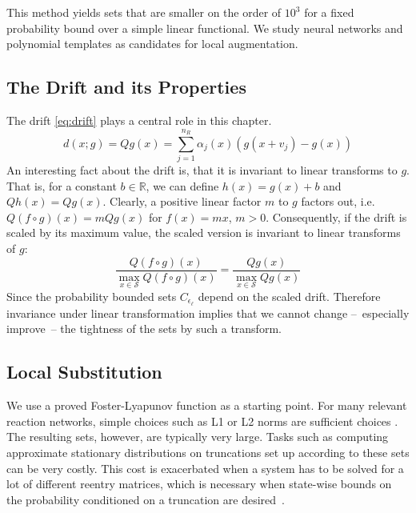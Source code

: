 This method yields sets that are smaller on the order of $10^3$ for a
fixed probability bound over a simple linear functional.
We study neural networks and polynomial templates as candidates for
local augmentation.

\subsection{The Drift and its Properties}
The drift \eqref{eq:drift} plays a central role in this
chapter.
\begin{equation}
  d(x; g) = Qg(x) = \sum_{j=1}^{n_R} \alpha_j(x) (g(x+v_j) -  g(x))
\end{equation}
An interesting fact about the drift is, that it is invariant to
linear transforms to $g$.
That is, for a constant $b\in\mathbb{R}$, we can define $h(x)=g(x)+b$
and \( Qh(x) =Qg(x)\).
Clearly, a positive linear factor $m$ to $g$ factors out,
i.e.\ $Q(f\circ g)(x)=mQg(x)$ for $f(x) = mx$, $m>0$.
Consequently, if the drift is scaled by its maximum value, the scaled
version is invariant to linear
transforms of $g$:
\begin{equation}
  \frac{Q(f\circ g)(x)}{\max_{x\in\mathcal{S}}Q(f \circ g)(x)}
  =
  \frac{Qg(x)}{\max_{x\in\mathcal{S}}Qg(x)}
\end{equation}
Since the probability bounded sets $C_{\epsilon_{\ell}}$ depend on
the scaled drift.
Therefore invariance under linear transformation implies that we
cannot change --~especially improve~-- the tightness of the sets by
such a transform.

\subsection{Local Substitution}
We use a proved Foster-Lyapunov function as a starting point.
For many relevant reaction networks, simple choices such as L1 or L2
norms are sufficient choices \parencite{spieler2014numerical}.
The resulting sets, however, are typically very large.
Tasks such as computing approximate stationary distributions on
truncations set up according to these sets can be very costly.
This cost is exacerbated when a system has to be solved for a lot of
different reentry matrices, which is necessary when state-wise bounds
on the probability conditioned on a truncation are
desired~\parencite{dayar2011bounding}.

